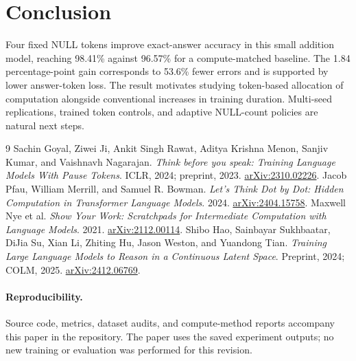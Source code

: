 \documentclass[10pt,twocolumn,letterpaper]{article}
\begin{document}
\section{Conclusion}
Four fixed NULL tokens improve exact-answer accuracy in this small addition
model, reaching 98.41\% against 96.57\% for a compute-matched baseline. The
1.84 percentage-point gain corresponds to 53.6\% fewer errors and is supported
by lower answer-token loss. The result motivates studying token-based
allocation of computation alongside conventional increases in training
duration. Multi-seed replications, trained token controls, and adaptive
NULL-count policies are natural next steps.

\begin{thebibliography}{9}
\small
{} Sachin Goyal, Ziwei Ji, Ankit Singh Rawat, Aditya Krishna Menon,
Sanjiv Kumar, and Vaishnavh Nagarajan. \emph{Think before you speak: Training
Language Models With Pause Tokens}. ICLR, 2024; preprint, 2023.
\href{https://arxiv.org/abs/2310.02226}{arXiv:2310.02226}.
 Jacob Pfau, William Merrill, and Samuel R. Bowman.
\emph{Let's Think Dot by Dot: Hidden Computation in Transformer Language
Models}. 2024. \href{https://arxiv.org/abs/2404.15758}{arXiv:2404.15758}.
 Maxwell Nye et al. \emph{Show Your Work: Scratchpads for
Intermediate Computation with Language Models}. 2021.
\href{https://arxiv.org/abs/2112.00114}{arXiv:2112.00114}.
 Shibo Hao, Sainbayar Sukhbaatar, DiJia Su, Xian Li, Zhiting Hu,
Jason Weston, and Yuandong Tian. \emph{Training Large Language Models to
Reason in a Continuous Latent Space}. Preprint, 2024; COLM, 2025.
\href{https://arxiv.org/abs/2412.06769}{arXiv:2412.06769}.
\end{thebibliography}

\paragraph{Reproducibility.}
Source code, metrics, dataset audits, and compute-method reports accompany
this paper in the repository. The paper uses the saved experiment outputs;
no new training or evaluation was performed for this revision.
\end{document}
